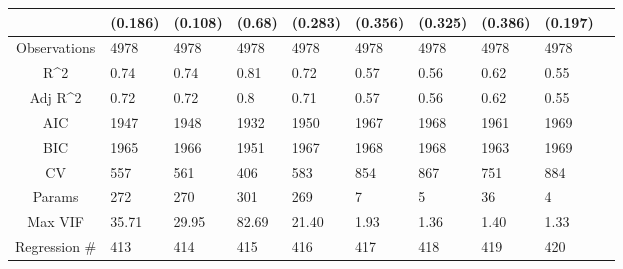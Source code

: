 \documentclass{article}
\begin{document}
\begin{table}[H]
\begin{tabular}{|clllllllll|}
   & (0.186) & (0.108) & (0.68) & (0.283) & (0.356) & (0.325) & (0.386) & (0.197) & \\ 
  \hline 
 Observations & 4978 & 4978 & 4978 & 4978 & 4978 & 4978 & 4978 & 4978 & \\ 
  R^2 & 0.74 & 0.74 & 0.81 & 0.72 & 0.57 & 0.56 & 0.62 & 0.55 & \\ 
  Adj R^2 & 0.72 & 0.72 & 0.8 & 0.71 & 0.57 & 0.56 & 0.62 & 0.55 & \\ 
  AIC & 1947 & 1948 & 1932 & 1950 & 1967 & 1968 & 1961 & 1969 & \\ 
  BIC & 1965 & 1966 & 1951 & 1967 & 1968 & 1968 & 1963 & 1969 & \\ 
  CV & 557 & 561 & 406 & 583 & 854 & 867 & 751 & 884 & \\ 
  Params & 272 & 270 & 301 & 269 & 7 & 5 & 36 & 4 & \\ 
  Max VIF & 35.71 & 29.95 & 82.69 & 21.40 & 1.93 & 1.36 & 1.40 & 1.33 & \\ 
  Regression \# & 413 & 414 & 415 & 416 & 417 & 418 & 419 & 420 & \\ 
   \hline
\end{tabular}
 
\end{table}
\end{document}
